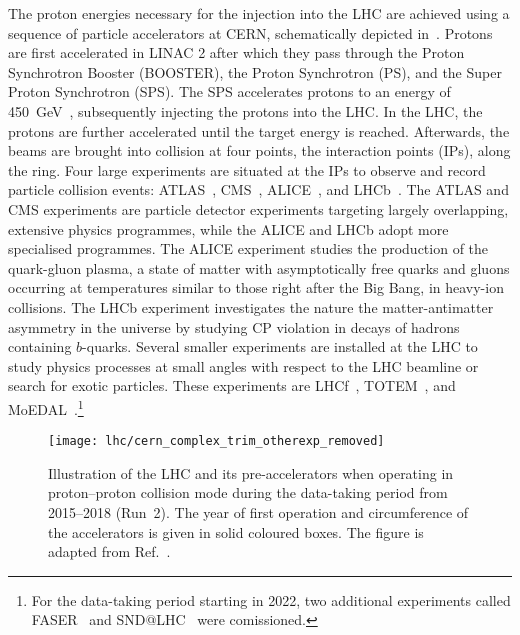 The proton energies necessary for the injection into the LHC are achieved using
a sequence of particle accelerators at CERN, schematically depicted
in~. Protons are first accelerated in LINAC 2
after which they pass through the Proton Synchrotron Booster (BOOSTER), the
Proton Synchrotron (PS), and the Super Proton Synchrotron (SPS). The SPS
accelerates protons to an energy of \SI{450}{\GeV}~\cite{Evans:2008zzb},
subsequently injecting the protons into the LHC. In the LHC, the protons are
further accelerated until the target energy is reached. Afterwards, the beams
are brought into collision at four points, the interaction points (IPs), along
the ring. Four large experiments are situated at the IPs to observe and record
particle collision events: ATLAS~\cite{PERF-2007-01}, CMS~\cite{CMS-CMS-00-001},
ALICE~\cite{ALICE:2008ngc}, and LHCb~\cite{LHCb:2008vvz}. The ATLAS and CMS
experiments are particle detector experiments targeting largely overlapping,
extensive physics programmes, while the ALICE and LHCb adopt more specialised
programmes. The ALICE experiment studies the production of the quark-gluon
plasma, a state of matter with asymptotically free quarks and gluons occurring
at temperatures similar to those right after the Big Bang, in heavy-ion
collisions. The LHCb experiment investigates the nature the matter-antimatter
asymmetry in the universe by studying CP violation in decays of hadrons
containing $b$-quarks. Several smaller experiments are installed at the LHC to
study physics processes at small angles with respect to the LHC beamline or
search for exotic particles. These experiments are LHCf~\cite{LHCf:2008lfy},
TOTEM~\cite{TOTEM:2008lue}, and MoEDAL~\cite{MoEDAL:2009jwa}.\footnote{For the
  data-taking period starting in 2022, two additional experiments called
  FASER~\cite{FASER:2019aik} and SND@LHC~\cite{Boyarsky:2021moj} were
  comissioned.}


\begin{figure}[htbp]
  \centering

  \texttt{[image: lhc/cern\_complex\_trim\_otherexp\_removed]}

  \caption[Illustration of the LHC and its pre-accelerators.]{Illustration of
    the LHC and its pre-accelerators when operating in proton--proton collision
    mode during the data-taking period from 2015--2018 (Run~2). The year of
    first operation and circumference of the accelerators is given in solid
    coloured boxes. The figure is adapted from Ref.~\cite{Mobs:2684277}.}%
  \label{fig:cern_accelerator_complex}
\end{figure}

